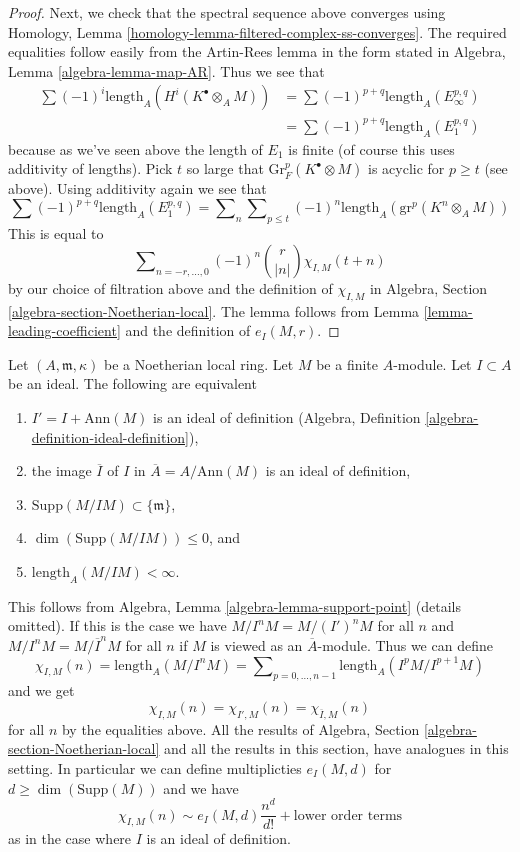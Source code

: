 \begin{proof}
\medskip\noindent
Next, we check that the spectral sequence above converges
using Homology, Lemma \ref{homology-lemma-filtered-complex-ss-converges}.
The required equalities follow easily from the Artin-Rees lemma
in the form stated in Algebra, Lemma \ref{algebra-lemma-map-AR}.
Thus we see that
\begin{align*}
\sum (-1)^i\text{length}_A(H^i(K^\bullet \otimes_A M))
& =
\sum (-1)^{p + q} \text{length}_A(E_\infty^{p, q}) \\
& =
\sum (-1)^{p + q} \text{length}_A(E_1^{p, q})
\end{align*}
because as we've seen above the length of $E_1$ is finite
(of course this uses additivity of lengths). Pick $t$ so
large that $\text{Gr}^p_F(K^\bullet \otimes M)$
is acyclic for $p \geq t$ (see above). Using
additivity again we see that
$$
\sum (-1)^{p + q} \text{length}_A(E_1^{p, q}) =
\sum\nolimits_n \sum\nolimits_{p \leq t}
(-1)^n \text{length}_A(\text{gr}^p(K^n \otimes_A M))
$$
This is equal to
$$
\sum\nolimits_{n = -r, \ldots, 0} (-1)^n{r \choose |n|} \chi_{I, M}(t + n)
$$
by our choice of filtration above and the definition of $\chi_{I, M}$ in
Algebra, Section \ref{algebra-section-Noetherian-local}.
The lemma follows from Lemma \ref{lemma-leading-coefficient}
and the definition of $e_I(M, r)$.
\end{proof}

\begin{remark}
\label{remark-trivial-generalization}
Let $(A, \mathfrak m, \kappa)$ be a Noetherian local ring.
Let $M$ be a finite $A$-module. Let $I \subset A$ be an ideal.
The following are equivalent
\begin{enumerate}
\item $I' = I + \text{Ann}(M)$ is an ideal of definition
(Algebra, Definition \ref{algebra-definition-ideal-definition}),
\item the image $\overline{I}$ of $I$ in $\overline{A} = A/\text{Ann}(M)$
is an ideal of definition,
\item $\text{Supp}(M/IM) \subset \{\mathfrak m\}$,
\item $\dim(\text{Supp}(M/IM)) \leq 0$, and
\item $\text{length}_A(M/IM) < \infty$.
\end{enumerate}
This follows from Algebra, Lemma \ref{algebra-lemma-support-point}
(details omitted). If this is the case we have $M/I^nM = M/(I')^nM$
for all $n$ and $M/I^nM = M/\overline{I}^nM$ for all $n$
if $M$ is viewed as an $\overline{A}$-module.
Thus we can define
$$
\chi_{I, M}(n) = \text{length}_A(M/I^nM) =
\sum\nolimits_{p = 0, \ldots, n - 1} \text{length}_A(I^pM/I^{p + 1}M)
$$
and we get
$$
\chi_{I, M}(n) = \chi_{I', M}(n) = \chi_{\overline{I}, M}(n)
$$
for all $n$ by the equalities above.
All the results of Algebra, Section \ref{algebra-section-Noetherian-local}
and all the results in this section, have analogues in this setting.
In particular we can define multiplicties $e_I(M, d)$ for
$d \geq \dim(\text{Supp}(M))$ and we have
$$
\chi_{I, M}(n) \sim e_I(M, d) \frac{n^d}{d!} + \text{lower order terms}
$$
as in the case where $I$ is an ideal of definition.
\end{remark}




